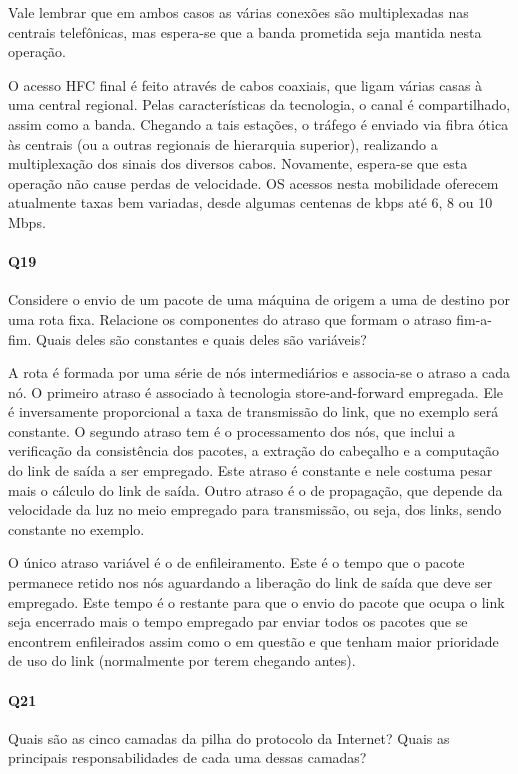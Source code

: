 Vale lembrar que em ambos casos as várias conexões são multiplexadas nas centrais telefônicas, mas espera-se que a banda prometida seja mantida nesta operação.

O acesso HFC final é feito através de cabos coaxiais, que ligam várias casas à uma central regional. Pelas características da tecnologia, o canal é compartilhado, assim como a banda.
Chegando a tais estações, o tráfego é enviado via fibra ótica às centrais (ou a outras regionais de hierarquia superior), realizando a multiplexação dos sinais dos diversos cabos. Novamente, espera-se que esta operação não cause perdas de velocidade.
OS acessos nesta mobilidade oferecem atualmente taxas bem variadas, desde algumas centenas de kbps até 6, 8 ou 10 Mbps.

\paragraph{Q19}
Considere o envio de um pacote de uma máquina de origem a uma de destino por uma rota fixa. Relacione os componentes do atraso que formam o atraso fim-a-fim. Quais deles são constantes e quais deles são variáveis?

A rota é formada por uma série de nós intermediários e associa-se o atraso a cada nó. O primeiro atraso é associado à tecnologia store-and-forward empregada. Ele é inversamente proporcional a taxa de transmissão do link, que no exemplo será constante.
O segundo atraso tem é o processamento dos nós, que inclui a verificação da consistência dos pacotes, a extração do cabeçalho e a computação do link de saída a ser empregado. Este atraso é constante e nele costuma pesar mais o cálculo do link de saída.
Outro atraso é o de propagação, que depende da velocidade da luz no meio empregado para transmissão, ou seja, dos links, sendo constante no exemplo.

O único atraso variável é o de enfileiramento. 
Este é o tempo que o pacote permanece retido nos nós aguardando a liberação do link de saída que deve ser empregado. Este tempo é o restante para que o envio do pacote que ocupa o link seja encerrado mais o tempo empregado par enviar todos os pacotes que se encontrem enfileirados assim como o em questão e que tenham maior prioridade de uso do link (normalmente por terem chegando antes).

\paragraph{Q21}
Quais são as cinco camadas da pilha do protocolo da Internet? Quais as principais responsabilidades de cada uma dessas camadas?

